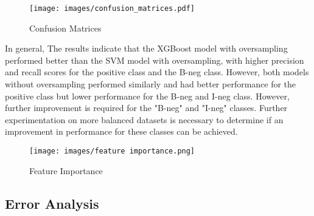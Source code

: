 \begin{figure}[!h]
    \centering
    \texttt{[image: images/confusion\_matrices.pdf]}
    \caption{Confusion Matrices}
    \label{fig:confusion_matrix}
\end{figure}

In general, The results indicate that the XGBoost model with oversampling performed better than the SVM model with oversampling, with higher precision and recall scores for the positive class and the B-neg class. However, both models without oversampling performed similarly and had better performance for the positive class but lower performance for the B-neg and I-neg class. However, further improvement is required for the "B-neg" and "I-neg" classes. Further experimentation on more balanced datasets is necessary to determine if an improvement in performance for these classes can be achieved.

\begin{figure}[!h]
    \centering
    \texttt{[image: images/feature importance.png]}
    \caption{Feature Importance}
    \label{fig:feature importance}
\end{figure}


\subsection*{Error Analysis}
